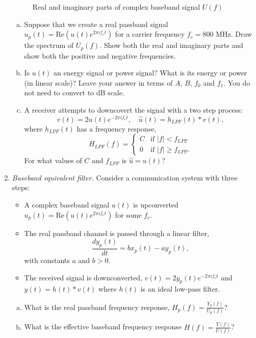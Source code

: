 \documentclass[11pt]{article}
\def\Real{\mathrm{Re}}
\begin{document}
\begin{enumerate}
\begin{figure}[h]
\caption{Real and imaginary parts of complex baseband signal $U(f)$} \label{fig:Ubb}
\end{figure}

\begin{enumerate}[(a)]


\item Suppose that we create a real passband signal $u_p(t) = \Real(u(t)e^{2\pi if_c t})$
for a carrier frequency $f_c = 800$ MHz.  Draw the spectrum of $U_p(f)$.  Show
 both the real and imaginary parts and show both the positive and negative frequencies.

\item Is $u(t)$ an energy signal or power signal?  What is its energy or power (in linear scale)?
Leave your answer in terms of $A$, $B$, $f_0$ and $f_1$.  You do not need to
convert to dB scale.

\item A receiver attempts to downcovert the signal with a two step process:
\[
    v(t)= 2u(t)e^{-2\pi i f_c t}, \quad \hat{u}(t) = h_{LPF}(t) * v(t),
\]
where $h_{LPF}(t)$ has a frequency response,
\[
    H_{LPF}(f) = \begin{cases}
        C & \mbox{if } |f| < f_{LPF} \\
        0 & \mbox{if } |f| \geq f_{LPF}.
        \end{cases}
\]
For what values of $C$ and $f_{LPF}$ is $\hat{u}=u(t)$?
\end{enumerate}

\item \emph{Baseband equivalent filter.}
Consider a communication system with three steps:
\begin{itemize}
\item A complex baseband signal $u(t)$ is upconverted $u_p(t)=\Real(u(t)e^{2\pi if_ct})$
for some $f_c$.
\item The real passband channel is passed through a linear filter,
\[
    \frac{dy_p(t)}{dt} = b x_p(t)- ay_p(t),
\]
with constants $a$ and $b>0$.
\item The received signal is downconverted, $v(t)=2y_p(t)e^{-2\pi i f_ct}$ and
$y(t)=h(t)*v(t)$ where $h(t)$ is an ideal low-pass filter.
\end{itemize}
\begin{enumerate}[(a)]
\item What is the real passband frequency response, $H_p(f) = \frac{Y_p(f)}{U_p(f)}$?

\item What is the effective baseband frequency response $H(f) = \frac{Y(f)}{U(f)}$?


\end{enumerate}
\end{enumerate}
\end{document}
